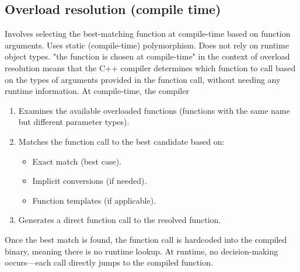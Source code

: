 \documentclass{report}
\begin{document}
\subsection{Overload resolution (compile time)}
\bigbreak \noindent 
Involves selecting the best-matching function at compile-time based on function arguments. Uses static (compile-time) polymorphism. Does not rely on runtime object types.
\bigbreak \noindent 
"the function is chosen at compile-time" in the context of overload resolution means that the C++ compiler determines which function to call based on the types of arguments provided in the function call, without needing any runtime information.
\bigbreak \noindent 
At compile-time, the compiler
\begin{enumerate}
    \item Examines the available overloaded functions (functions with the same name but different parameter types).
    \item Matches the function call to the best candidate based on:
        \begin{itemize}
            \item Exact match (best case).
            \item Implicit conversions (if needed).
            \item Function templates (if applicable).
        \end{itemize}
    \item Generates a direct function call to the resolved function.
\end{enumerate}
\bigbreak \noindent 
Once the best match is found, the function call is hardcoded into the compiled binary, meaning there is no runtime lookup.
\bigbreak \noindent 
At runtime, no decision-making occurs—each call directly jumps to the compiled function.
\end{document}
